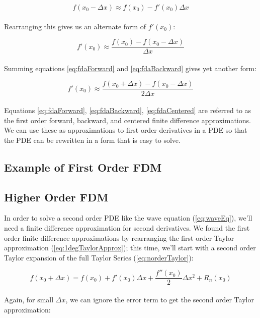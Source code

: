 {     \begin{equation}
 f(x_{0} - \Delta  x) \approx f(x_{0}) - f'(x_{0})\Delta x
  \end{equation}
    \\
  Rearranging this gives us an alternate form of $ f'(x_{0})$:

 \begin{equation}\label{eq:fdaBackward}
 f'(x_{0}) \approx \frac{f(x_{0}) - f(x_{0} - \Delta  x)}{\Delta  x}
  \end{equation}
    \\
Summing equations \ref{eq:fdaForward} and \ref{eq:fdaBackward} gives yet another form:
  
     \begin{equation}\label{eq:fdaCentered}
 f'(x_{0}) \approx \frac{f(x_{0} + \Delta  x) - f(x_{0} - \Delta  x)}{2\Delta x}
  \end{equation}
  \\
  Equations \ref{eq:fdaForward}, \ref{eq:fdaBackward}, \ref{eq:fdaCentered} are referred to as the first order forward, backward, and centered finite difference approximations.  We can use these as approximations to first order derivatives in a PDE so that the PDE can be rewritten in a form that is easy to solve.
  
\subsection{Example of First Order FDM}



\subsection{Higher Order FDM}

In order to solve a second order PDE like the wave equation (\ref{eq:waveEq}), we'll need a finite difference approximation for second derivatives.  We found the first order finite difference approximations by rearranging the first order Taylor approximation (\ref{eq:1degTaylorApprox}); this time, we'll start with a second order Taylor expansion of the full Taylor Series (\ref{eq:norderTaylor}):

 \begin{equation}
  f(x_{0} + \Delta  x) = f(x_{0}) + f'(x_{0})\Delta  x + \frac{f''(x_{0})}{2}\Delta  x^{2} + R_{n}(x_{0})
  \end{equation}
    \\
  Again, for small $\Delta  x$, we can ignore the error term to get the second order Taylor approximation:
  
}
